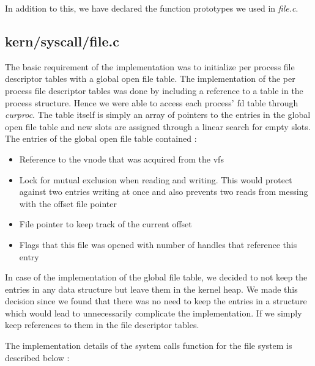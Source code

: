 \documentclass[a4paper]{article}
\begin{document}
In addition to this, we have declared the function prototypes we used in \textit{file.c}.

\subsection{kern/syscall/file.c}
The basic requirement of the implementation was to initialize per process file descriptor tables with a global open file table.  The implementation of the per process file descriptor tables was done by including a reference
to a table in the process structure. Hence we were able to access each
process' fd table through \textit{curproc}.  The table itself is simply an array of pointers to the entries in the global open file table and new slots are assigned through a linear search for empty slots.
The entries of the global open file table contained :
\begin{itemize}
	\item Reference to the vnode that was acquired from the vfs
	\item Lock for mutual exclusion when reading and writing. This would protect against two entries writing at once and also prevents two reads from messing with the offset file pointer
	\item File pointer to keep track of the current offset
	\item Flags that this file was opened with number of handles that reference this entry
\end{itemize}

In case of the implementation of the global file table, we decided to not keep the entries in any data structure but leave them in the kernel heap. We made this decision since we found that there was no need to keep the
entries in a structure which would lead to unnecessarily complicate the implementation. If we simply keep references to them in the file descriptor tables.

The implementation details of the system calls function for the file system is described below : 
\end{document}
